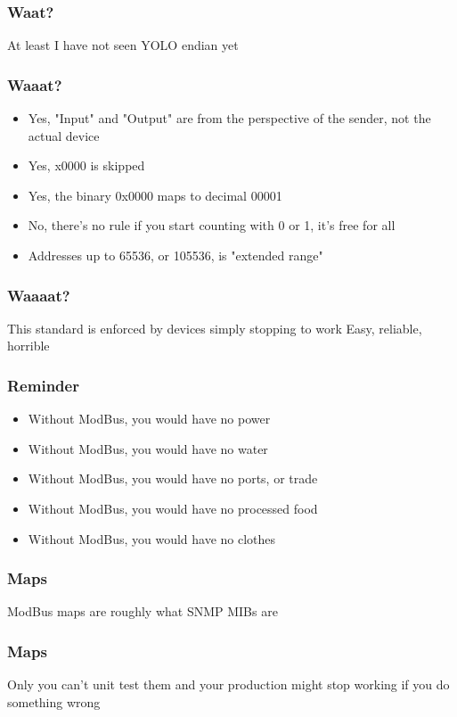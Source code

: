 \documentclass[aspectratio=169]{beamer}
\begin{document}
\begin{frame}
	\frametitle{Waat?}
	\centering
	\vfill
	At least I have not seen YOLO endian yet
	\vfill
\end{frame}

\begin{frame}
	\frametitle{Waaat?}
	\begin{itemize}
		\item Yes, "Input" and "Output" are from the perspective of the sender, not the actual device
		\item Yes, x0000 is skipped
		\item Yes, the binary 0x0000 maps to decimal 00001
		\item No, there's no rule if you start counting with 0 or 1, it's free for all
		\item Addresses up to 65536, or 105536, is "extended range"
	\end{itemize}
\end{frame}

\begin{frame}
	\frametitle{Waaaat?}
	\centering
	\vfill
	This standard is enforced by devices simply stopping to work
	\vfill
	Easy, reliable, horrible
	\vfill
\end{frame}

\begin{frame}
	\frametitle{Reminder}
	\begin{itemize}
		\item Without ModBus, you would have no power
		\item Without ModBus, you would have no water
		\item Without ModBus, you would have no ports, or trade
		\item Without ModBus, you would have no processed food
		\item Without ModBus, you would have no clothes
	\end{itemize}
\end{frame}

\begin{frame}
	\frametitle{Maps}
	\centering
	\vfill
	ModBus maps are roughly what SNMP MIBs are
	\vfill
\end{frame}

\begin{frame}
	\frametitle{Maps}
	\centering
	\vfill
	Only you can't unit test them and your production might stop working if you do something wrong
	\vfill
\end{frame}
\end{document}
